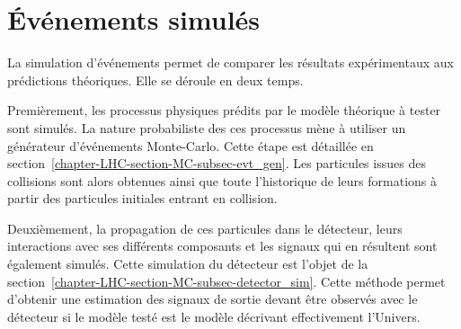 \section{Événements simulés}\label{chapter-LHC-section-MC}
La simulation d'événements permet de comparer les résultats expérimentaux aux prédictions théoriques.
Elle se déroule en deux temps.
\par Premièrement, les processus physiques prédits par le modèle théorique à tester sont simulés.
La nature probabiliste des ces processus mène à utiliser un générateur d'événements Monte-Carlo.
Cette étape est détaillée en section~\ref{chapter-LHC-section-MC-subsec-evt_gen}.
Les particules issues des collisions sont alors obtenues ainsi que toute l'historique de leurs formations à partir des particules initiales entrant en collision.
\par Deuxièmement, la propagation de ces particules dans le détecteur, leurs interactions avec ses différents composants et les signaux qui en résultent sont également simulés.
Cette simulation du détecteur est l'objet de la section~\ref{chapter-LHC-section-MC-subsec-detector_sim}.
Cette méthode permet d'obtenir une estimation des signaux de sortie devant être observés avec le détecteur si le modèle testé est le modèle décrivant effectivement l'Univers.
